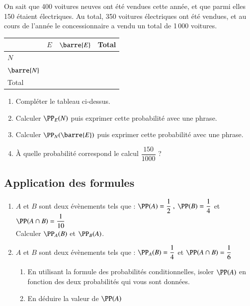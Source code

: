 \documentclass[oneside,12pt]{article}          %
\begin{document}
On sait que 400 voitures neuves ont été vendues cette année, et que parmi elles 150 étaient électriques. Au total, 350 voitures électriques ont été vendues, et au cours de l'année le concessionnaire a vendu un total de 1\,000 voitures.
\begin{center}
	\renewcommand{\arraystretch}{1.75}
    \begin{tabular}{| P{4cm} | P{3cm} | P{3cm} | P{3cm} |}\hline
		 & $E$ & $\barre{E}$ & Total\\ \hline
	    $N$ & & &  \\ \hline
	    $\barre{N}$ & & &  \\ \hline
	    Total & & & \\ \hline
    \end{tabular}
\end{center}
\begin{enumerate}
	\item Compléter le tableau ci-dessus.
	\item Calculer $\PP_E(N)$ puis exprimer cette probabilité avec une phrase.
	\item Calculer $\PP_N(\barre{E})$ puis exprimer cette probabilité avec une phrase.
	\item À quelle probabilité correspond le calcul $\dfrac{150}{1000}$ ?
\end{enumerate}



\subsection{Application des formules}
\begin{enumerate} \setlength{\itemsep}{1mm}
    \item $A$ et $B$ sont deux évènements tels que : $\PP(A) = \dfrac{1}{2} ~,~ \PP(B) = \dfrac{1}{4}$ et $\PP(A \cap B) = \dfrac{1}{10}$ \\
    Calculer $\PP_{A}(B)$ et $\PP_{B}(A)$.
	\item $A$ et $B$ sont deux évènements tels que : $\PP_A(B) = \dfrac{1}{4}$ et $\PP(A \cap B) = \dfrac{1}{6}$ 
	\begin{enumerate}
		\item En utilisant la formule des probabilités conditionnelles, isoler $\PP(A)$ en fonction des deux probabilités qui vous sont données.
		\item En déduire la valeur de $\PP(A)$
	\end{enumerate}
\end{enumerate}
\end{document}
